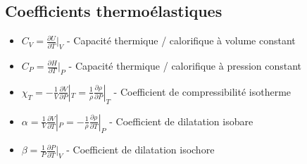 \documentclass[openany]{book}
\begin{document}
\subsection{Coefficients thermoélastiques}
\begin{itemize}
    \item $C_V = \frac{\partial U}{\partial T}|_V$ - Capacité thermique / calorifique à volume constant
    \item $C_P = \frac{\partial H}{\partial T}|_P$ - Capacité thermique / calorifique à pression constant
    \item $\chi_T = -\frac{1}{V} \frac{\partial V}{\partial P}|_T = \frac{1}{\rho} \frac{\partial \rho}{\partial P}|_T$ - Coefficient de compressibilité isotherme
    \item $\alpha = \frac{1}{V}\frac{\partial V}{\partial T}|_P = -\frac{1}{\rho} \frac{\partial \rho}{\partial T}|_P$ - Coefficient de dilatation isobare
    \item $\beta = \frac{1}{P}\frac{\partial P}{\partial T}|_V$ - Coefficient de dilatation isochore
\end{itemize}
\end{document}

